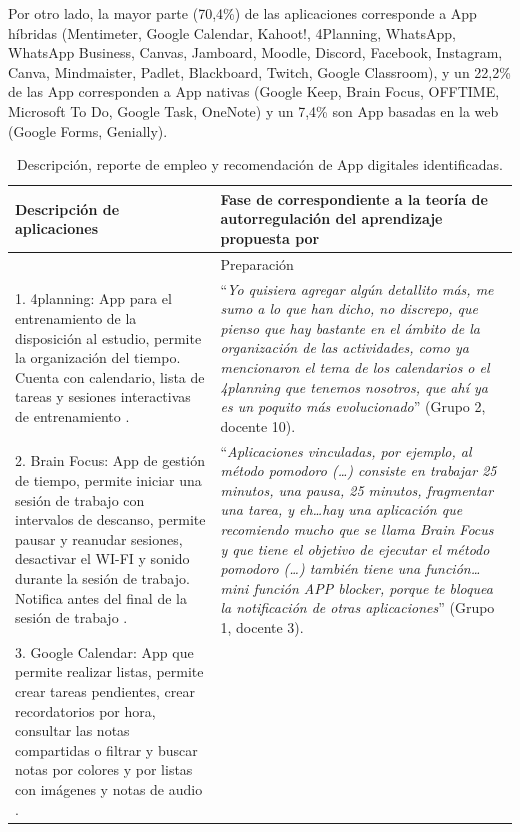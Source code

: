 \documentclass[spanish]{textolivre}
\begin{document}
Por otro lado, la mayor parte (70,4\%) de las aplicaciones corresponde a App híbridas (Mentimeter, Google Calendar, Kahoot!, 4Planning, WhatsApp, WhatsApp Business, Canvas, Jamboard, Moodle, Discord, Facebook, Instagram, Canva, Mindmaister, Padlet, Blackboard, Twitch, Google Classroom), y un 22,2\% de las App corresponden a App nativas (Google Keep, Brain Focus, OFFTIME, Microsoft To Do, Google Task, OneNote) y un 7,4\% son App basadas en la web (Google Forms, Genially). 

\begin{longtable}{p{}p{}}
\caption{Descripción, reporte de empleo y recomendación de App digitales identificadas.}
\label{tab2}
\\
\toprule
Descripción de aplicaciones & Fase de correspondiente a la teoría de autorregulación del aprendizaje propuesta por \textcite{zimmerman2013}
\\
\midrule
\arrayrulecolor[gray]{.7}
& Preparación
\\
\midrule
1. 4planning: App para el entrenamiento de la disposición al estudio, permite la organización del tiempo. Cuenta con calendario, lista de tareas y sesiones interactivas de entrenamiento \cite{centro_de_formacion_y_recursos_didacticos_udec_4planning_2020}. &
“\emph{Yo quisiera agregar algún detallito más, me sumo a lo que han dicho, no discrepo, que pienso que hay bastante en el ámbito de la organización de las actividades, como ya mencionaron el tema de los calendarios o el 4planning  que tenemos nosotros, que ahí ya es un poquito más evolucionado}” (Grupo 2, docente 10).
\\
2. Brain Focus: App de gestión de tiempo, permite iniciar una sesión de trabajo con intervalos de descanso, permite pausar y reanudar sesiones, desactivar el WI-FI y sonido durante la sesión de trabajo. Notifica antes del final de la sesión de trabajo \cite{brain_focus2020}. &
“\emph{Aplicaciones vinculadas, por ejemplo, al método pomodoro (…) consiste en trabajar 25 minutos, una pausa, 25 minutos, fragmentar una tarea, y eh…hay una aplicación que recomiendo mucho que se llama Brain Focus y que tiene el objetivo de ejecutar el método pomodoro (…) también tiene una función…mini función APP blocker, porque te bloquea la notificación de otras aplicaciones}” (Grupo 1, docente 3).
\\
3. Google Calendar: App que permite realizar listas, permite crear tareas pendientes, crear recordatorios por hora, consultar las notas compartidas o filtrar y buscar notas por colores y por listas con imágenes y notas de audio \cite{google2021a}. &

\end{longtable}
\end{document}
